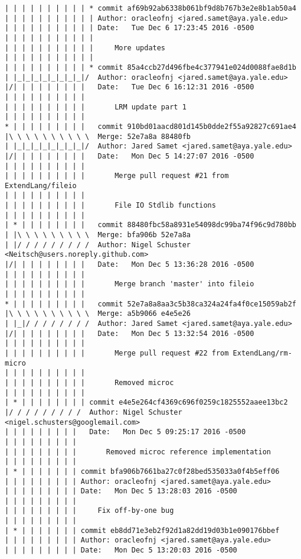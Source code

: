 \begin{lstlisting}
| | | | | | | | | | * commit af69b92ab6338b061bf9d8b767b3e2e8b1ab50a4
| | | | | | | | | | | Author: oracleofnj <jared.samet@aya.yale.edu>
| | | | | | | | | | | Date:   Tue Dec 6 17:23:45 2016 -0500
| | | | | | | | | | | 
| | | | | | | | | | |     More updates
| | | | | | | | | | |            
| | | | | | | | | | * commit 85a4ccb27d496fbe4c377941e024d0088fae8d1b
| |_|_|_|_|_|_|_|_|/  Author: oracleofnj <jared.samet@aya.yale.edu>
|/| | | | | | | | |   Date:   Tue Dec 6 16:12:31 2016 -0500
| | | | | | | | | |   
| | | | | | | | | |       LRM update part 1
| | | | | | | | | |             
* | | | | | | | | |   commit 910bd01aacd801d145b0dde2f55a92827c691ae4
|\ \ \ \ \ \ \ \ \ \  Merge: 52e7a8a 88480fb
| |_|_|_|_|_|_|_|_|/  Author: Jared Samet <jared.samet@aya.yale.edu>
|/| | | | | | | | |   Date:   Mon Dec 5 14:27:07 2016 -0500
| | | | | | | | | |   
| | | | | | | | | |       Merge pull request #21 from ExtendLang/fileio
| | | | | | | | | |       
| | | | | | | | | |       File IO Stdlib functions
| | | | | | | | | |             
| * | | | | | | | |   commit 88480fbc58a8931e54098dc99ba74f96c9d780bb
| |\ \ \ \ \ \ \ \ \  Merge: bfa906b 52e7a8a
| |/ / / / / / / / /  Author: Nigel Schuster <Neitsch@users.noreply.github.com>
|/| | | | | | | | |   Date:   Mon Dec 5 13:36:28 2016 -0500
| | | | | | | | | |   
| | | | | | | | | |       Merge branch 'master' into fileio
| | | | | | | | | |             
* | | | | | | | | |   commit 52e7a8a8aa3c5b38ca324a24fa4f0ce15059ab2f
|\ \ \ \ \ \ \ \ \ \  Merge: a5b9066 e4e5e26
| |_|/ / / / / / / /  Author: Jared Samet <jared.samet@aya.yale.edu>
|/| | | | | | | | |   Date:   Mon Dec 5 13:32:54 2016 -0500
| | | | | | | | | |   
| | | | | | | | | |       Merge pull request #22 from ExtendLang/rm-micro
| | | | | | | | | |       
| | | | | | | | | |       Removed microc
| | | | | | | | | |           
| * | | | | | | | | commit e4e5e264cf4369c696f0259c1825552aaee13bc2
|/ / / / / / / / /  Author: Nigel Schuster <nigel.schusters@googlemail.com>
| | | | | | | | |   Date:   Mon Dec 5 09:25:17 2016 -0500
| | | | | | | | |   
| | | | | | | | |       Removed microc reference implementation
| | | | | | | | |          
| * | | | | | | | commit bfa906b7661ba27c0f28bed535033a0f4b5eff06
| | | | | | | | | Author: oracleofnj <jared.samet@aya.yale.edu>
| | | | | | | | | Date:   Mon Dec 5 13:28:03 2016 -0500
| | | | | | | | | 
| | | | | | | | |     Fix off-by-one bug
| | | | | | | | |          
| * | | | | | | | commit eb8dd71e3eb2f92d1a82dd19d03b1e090176bbef
| | | | | | | | | Author: oracleofnj <jared.samet@aya.yale.edu>
| | | | | | | | | Date:   Mon Dec 5 13:20:03 2016 -0500

\end{lstlisting}
